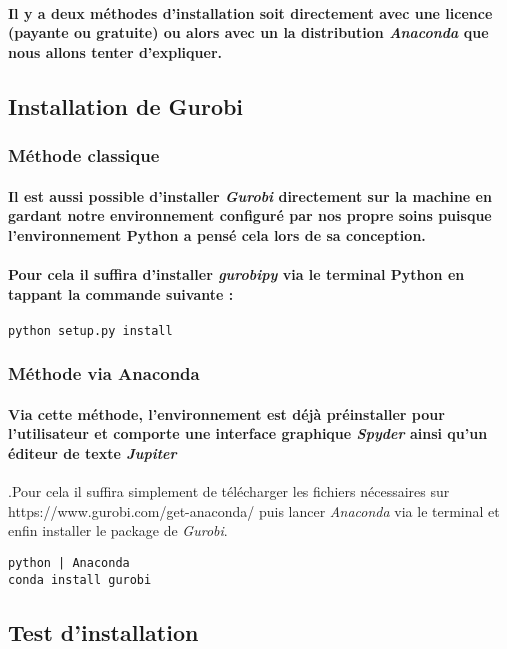 \documentclass[a4paper, 12pt, twoside]{article}
\begin{document}
\paragraph{Il y a deux méthodes d'installation soit directement avec une licence (payante ou gratuite) ou alors avec un la distribution \textit{Anaconda} que nous allons tenter d'expliquer.}

\subsection{Installation de Gurobi}
\subsubsection{Méthode classique }
\paragraph{Il est aussi possible d'installer \textit{Gurobi} directement sur la machine en gardant notre environnement configuré par nos propre soins puisque l'environnement Python a pensé cela lors de sa conception.}
\paragraph{Pour cela il suffira d'installer \textit{gurobipy} via le terminal Python en tappant la commande suivante :}
\begin{verbatim}
python setup.py install
\end{verbatim}

\subsubsection{Méthode via Anaconda }
\paragraph{Via cette méthode, l'environnement est déjà préinstaller pour l'utilisateur et comporte une interface graphique \textit{Spyder} ainsi qu'un éditeur de texte \textit{Jupiter}}.Pour cela il suffira simplement de télécharger les fichiers nécessaires sur https://www.gurobi.com/get-anaconda/ puis lancer  \textit{Anaconda} via le terminal et enfin installer le package de \textit{Gurobi}.

\begin{verbatim}
python | Anaconda
conda install gurobi 
\end{verbatim}
\subsection{Test d'installation}
\end{document}
